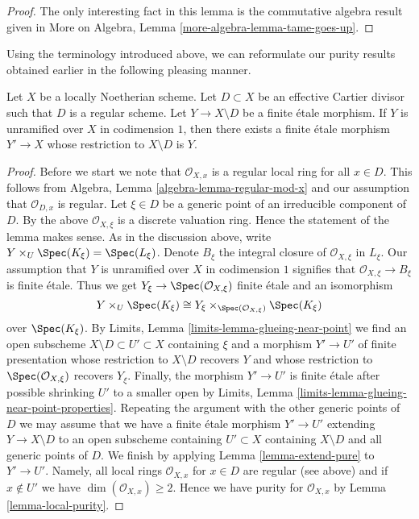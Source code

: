 \begin{proof}
The only interesting fact in this lemma is the commutative algebra
result given in More on Algebra, Lemma \ref{more-algebra-lemma-tame-goes-up}.
\end{proof}

\noindent
Using the terminology introduced above, we can reformulate our
purity results obtained earlier in the following pleasing manner.

\begin{lemma}
\label{lemma-purity-one-divisor}
Let $X$ be a locally Noetherian scheme. Let $D \subset X$
be an effective Cartier divisor such that $D$ is a regular scheme.
Let $Y \to X \setminus D$ be a finite \'etale morphism.
If $Y$ is unramified over $X$ in codimension $1$, then
there exists a finite \'etale morphism $Y' \to X$
whose restriction to $X \setminus D$ is $Y$.
\end{lemma}

\begin{proof}
Before we start we note that $\mathcal{O}_{X, x}$ is a regular
local ring for all $x \in D$. This follows from
Algebra, Lemma \ref{algebra-lemma-regular-mod-x}
and our assumption that $\mathcal{O}_{D, x}$ is regular.
Let $\xi \in D$ be a generic point of an irreducible component of $D$.
By the above $\mathcal{O}_{X, \xi}$ is a discrete valuation ring.
Hence the statement of the lemma makes sense.
As in the discussion above, write
$Y \times_U \Spec(K_\xi) = \Spec(L_\xi)$.
Denote $B_\xi$ the integral closure of $\mathcal{O}_{X, \xi}$ in
$L_\xi$. Our assumption that $Y$ is unramified over $X$ in codimension $1$
signifies that $\mathcal{O}_{X, \xi} \to B_\xi$ is finite \'etale.
Thus we get $Y_\xi \to \Spec(\mathcal{O}_{X, \xi})$ finite
\'etale and an isomorphism
$$
Y \times_U \Spec(K_\xi) \cong
Y_\xi \times_{\Spec(\mathcal{O}_{X, \xi})} \Spec(K_\xi)
$$
over $\Spec(K_\xi)$.
By Limits, Lemma \ref{limits-lemma-glueing-near-point}
we find an open subscheme $X \setminus D \subset U' \subset X$
containing $\xi$ and a morphism $Y' \to U'$ of finite presentation
whose restriction to $X \setminus D$ recovers $Y$ and
whose restriction to $\Spec(\mathcal{O}_{X, \xi})$ recovers $Y_\xi$.
Finally, the morphism $Y' \to U'$ is finite \'etale
after possible shrinking $U'$ to a smaller open by
Limits, Lemma \ref{limits-lemma-glueing-near-point-properties}.
Repeating the argument with the other generic points of
$D$ we may assume that we have a finite \'etale morphism $Y' \to U'$
extending $Y \to X\setminus D$ to an open subscheme
containing $U' \subset X$ containing $X \setminus D$
and all generic points of $D$.
We finish by applying Lemma \ref{lemma-extend-pure}
to $Y' \to U'$. Namely, all local rings $\mathcal{O}_{X, x}$
for $x \in D$ are regular (see above) and if $x \not \in U'$
we have $\dim(\mathcal{O}_{X, x}) \geq 2$. Hence we have
purity for $\mathcal{O}_{X, x}$ by
Lemma \ref{lemma-local-purity}.
\end{proof}

